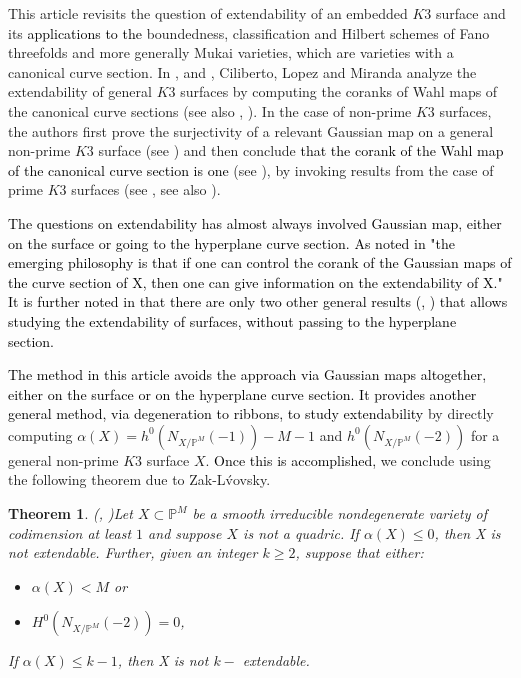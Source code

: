 \documentclass[11pt,twoside]{amsart}
\theoremstyle{plain}
\numberwithin{equation}{section}
\newtheorem{theorem}{Theorem}[section]
\theoremstyle{definition}
\begin{document}
This article revisits the question of extendability of an embedded $K3$ surface and its \textcolor{black}{applications}  \textcolor{black}{to the} boundedness, classification and Hilbert schemes of Fano threefolds and more generally Mukai varieties, which are varieties with a canonical curve section. In \cite{CLM93}, \cite{CLM94} and \cite{CLM98},  Ciliberto, Lopez and Miranda analyze the extendability of general $K3$ surfaces by computing the coranks of Wahl maps of the canonical curve sections (see also \cite{CD22}, \cite{CD24}). In the case of non-prime $K3$ surfaces, the authors first prove the surjectivity of a relevant Gaussian map on a general non-prime $K3$ surface (see \cite{CLM94}) and then conclude  \textcolor{black}{that the corank of the Wahl map of the canonical curve section is one} (see \cite{CLM98}), by invoking results from the case of prime $K3$ surfaces (see \cite[Lemma $2.3$]{CLM98} \cite[Lemma $4$]{CLM93}, see also \cite{K20} ). %

\smallskip

\textcolor{black}{The questions on extendability has almost always involved Gaussian map, either on the surface or going to the hyperplane curve section. As noted in \cite{Lop23} "the emerging philosophy is that if one can control the corank of the Gaussian maps of the curve section of X, then one can give information on the extendability of X." It is further noted in \cite{Lop23} that there \textcolor{black}{are} only \textcolor{black}{two} other general results (\cite{KLM11}, \cite{CDGK20}) that allows studying the extendability of surfaces, without passing to the hyperplane section.}\

\smallskip

 \textcolor{black}{The method in this article  avoids the approach via Gaussian maps altogether, either on the surface or on the hyperplane curve section. It provides another general method, via degeneration to ribbons, to study extendability} by directly computing $\alpha(X) = h^0(N_{X/\mathbb{P}^M}(-1))-M-1$ and $h^0(N_{X/\mathbb{P}^M}(-2))$ for a general non-prime $K3$ surface $X$. \textcolor{black}{Once this is accomplished,} we conclude using the following theorem due to Zak-L\'vovsky. 

\begin{theorem}(\cite{Lvo92}, \cite{Zak91})\label{ZL}
Let $X \subset \mathbb{P}^{M}$ be a smooth irreducible nondegenerate variety of codimension at least $1$ and suppose $X$ is not a quadric. If $\alpha(X) \leq 0$, then X is not extendable. Further, given an integer $k \geq 2$, suppose that either:
\begin{itemize}
    \item[(1)] $\alpha(X) < M$ or
    \item[(2)] $H^0(N_{X/\mathbb{P}^M}(-2)) = 0$,
\end{itemize}
If $\alpha(X) \leq k-1$, then X is not $k-$ extendable.  

\end{theorem}
\end{document}
